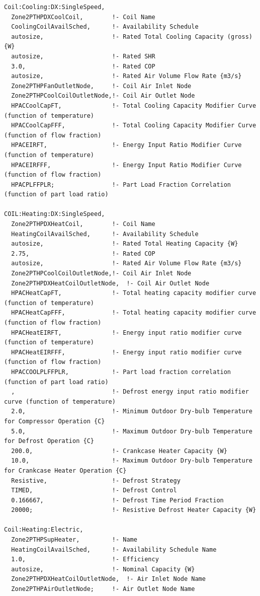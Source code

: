 \begin{lstlisting}
Coil:Cooling:DX:SingleSpeed,
  Zone2PTHPDXCoolCoil,        !- Coil Name
  CoolingCoilAvailSched,      !- Availability Schedule
  autosize,                   !- Rated Total Cooling Capacity (gross) {W}
  autosize,                   !- Rated SHR
  3.0,                        !- Rated COP
  autosize,                   !- Rated Air Volume Flow Rate {m3/s}
  Zone2PTHPFanOutletNode,     !- Coil Air Inlet Node
  Zone2PTHPCoolCoilOutletNode,!- Coil Air Outlet Node
  HPACCoolCapFT,              !- Total Cooling Capacity Modifier Curve (function of temperature)
  HPACCoolCapFFF,             !- Total Cooling Capacity Modifier Curve (function of flow fraction)
  HPACEIRFT,                  !- Energy Input Ratio Modifier Curve (function of temperature)
  HPACEIRFFF,                 !- Energy Input Ratio Modifier Curve (function of flow fraction)
  HPACPLFFPLR;                !- Part Load Fraction Correlation (function of part load ratio)

COIL:Heating:DX:SingleSpeed,
  Zone2PTHPDXHeatCoil,        !- Coil Name
  HeatingCoilAvailSched,      !- Availability Schedule
  autosize,                   !- Rated Total Heating Capacity {W}
  2.75,                       !- Rated COP
  autosize,                   !- Rated Air Volume Flow Rate {m3/s}
  Zone2PTHPCoolCoilOutletNode,!- Coil Air Inlet Node
  Zone2PTHPDXHeatCoilOutletNode,  !- Coil Air Outlet Node
  HPACHeatCapFT,              !- Total heating capacity modifier curve (function of temperature)
  HPACHeatCapFFF,             !- Total heating capacity modifier curve (function of flow fraction)
  HPACHeatEIRFT,              !- Energy input ratio modifier curve (function of temperature)
  HPACHeatEIRFFF,             !- Energy input ratio modifier curve (function of flow fraction)
  HPACCOOLPLFFPLR,            !- Part load fraction correlation (function of part load ratio)
  ,                           !- Defrost energy input ratio modifier curve (function of temperature)
  2.0,                        !- Minimum Outdoor Dry-bulb Temperature for Compressor Operation {C}
  5.0,                        !- Maximum Outdoor Dry-bulb Temperature for Defrost Operation {C}
  200.0,                      !- Crankcase Heater Capacity {W}
  10.0,                       !- Maximum Outdoor Dry-bulb Temperature for Crankcase Heater Operation {C}
  Resistive,                  !- Defrost Strategy
  TIMED,                      !- Defrost Control
  0.166667,                   !- Defrost Time Period Fraction
  20000;                      !- Resistive Defrost Heater Capacity {W}

Coil:Heating:Electric,
  Zone2PTHPSupHeater,         !- Name
  HeatingCoilAvailSched,      !- Availability Schedule Name
  1.0,                        !- Efficiency
  autosize,                   !- Nominal Capacity {W}
  Zone2PTHPDXHeatCoilOutletNode,  !- Air Inlet Node Name
  Zone2PTHPAirOutletNode;     !- Air Outlet Node Name
\end{lstlisting}


